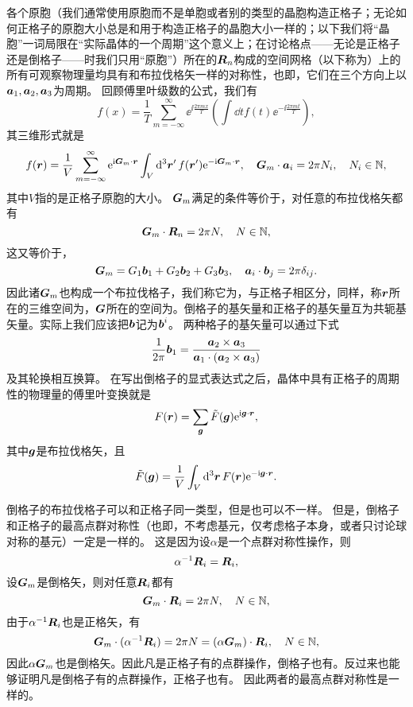各个原胞（我们通常使用原胞而不是单胞或者别的类型的晶胞构造正格子；无论如何正格子的原胞大小总是和用于构造正格子的晶胞大小一样的；以下我们将“晶胞”一词局限在“实际晶体的一个周期”这个意义上；在讨论格点——无论是正格子还是倒格子——时我们只用“原胞”）所在的$\vb*{R}_n$构成的空间网格（以下称为）上的所有可观察物理量均具有和布拉伐格矢一样的对称性，也即，它们在三个方向上以$\vb*{a}_1,\vb*{a}_2,\vb*{a}_3$为周期。
回顾傅里叶级数的公式，我们有
\[
    f(x) = \frac{1}{T} \sum_{m=-\infty}^\infty \ee^{\ii \frac{2\pi m x}{T}} \left(\int \dd{t} f(t) \ee^{-\ii \frac{2\pi m t}{T}}\right) ,
\]
其三维形式就是
\[
    f(\vb*{r}) = \frac{1}{V} \sum_{m=-\infty}^\infty \mathrm{e}^{\mathrm{i} \vb*{G}_m \cdot \vb*{r}} \int_V \dd[3]{\vb*{r}'} f(\vb*{r}') \mathrm{e}^{- \mathrm{i} \vb*{G}_m \cdot \vb*{r}}, \quad \vb*{G}_m \cdot \vb*{a}_i = 2\pi N_i, \quad N_i \in \mathbb{N},
\]
其中$V$指的是正格子原胞的大小。
$\vb*{G}_m$满足的条件等价于，对任意的布拉伐格矢都有
\begin{equation}
    \vb*{G}_m \cdot \vb*{R}_n = 2\pi N, \quad N \in \mathbb{N},
\end{equation}
这又等价于，
\begin{equation}
    \vb*{G}_m = G_1 \vb*{b}_1 + G_2 \vb*{b}_2 + G_3 \vb*{b}_3, \quad \vb*{a}_i \cdot \vb*{b}_j = 2 \pi \delta_{ij}.
\end{equation}
因此诸$\vb*{G}_m$也构成一个布拉伐格子，我们称它为，与正格子相区分，同样，称$\vb*{r}$所在的三维空间为，$\vb*{G}$所在的空间为。倒格子的基矢量和正格子的基矢量互为共轭基矢量。实际上我们应该把$\vb*{b}$记为$\vb*{b}^{i}$。
两种格子的基矢量可以通过下式
\begin{equation}
    \frac{1}{2\pi} \vb*{b}_1 = \frac{\vb*{a}_2 \times \vb*{a}_3}{\vb*{a}_1 \cdot (\vb*{a}_2 \times \vb*{a}_3)}
\end{equation}
及其轮换相互换算。
在写出倒格子的显式表达式之后，晶体中具有正格子的周期性的物理量的傅里叶变换就是
\begin{equation}
    F(\vb*{r}) = \sum_{\vb*{g}} \tilde{F}(\vb*{g}) \mathrm{e}^{\mathrm{i} \vb*{g} \cdot \vb*{r}},
\end{equation}
其中$\vb*{g}$是布拉伐格矢，且
\begin{equation}
    \tilde{F}(\vb*{g}) = \frac{1}{V} \int_V \dd[3]{\vb*{r}} F(\vb*{r}) \mathrm{e}^{-\mathrm{i} \vb*{g} \cdot \vb*{r}}.
\end{equation}

倒格子的布拉伐格子可以和正格子同一类型，但是也可以不一样。
但是，倒格子和正格子的最高点群对称性（也即，不考虑基元，仅考虑格子本身，或者只讨论球对称的基元）一定是一样的。
这是因为设$\alpha$是一个点群对称性操作，则
\[
    \alpha^{-1} \vb*{R}_i = \vb*{R}_i,
\]
设$\vb*{G}_m$是倒格矢，则对任意$\vb*{R}_i$都有
\[
    \vb*{G}_m \cdot \vb*{R}_i = 2 \pi N, \quad N \in \mathbb{N},
\]
由于$\alpha^{-1} \vb*{R}_i$也是正格矢，有
\[
    \vb*{G}_m \cdot (\alpha^{-1} \vb*{R}_i) = 2 \pi N = (\alpha \vb*{G}_m) \cdot \vb*{R}_i, \quad N \in \mathbb{N},
\]
因此$\alpha \vb*{G}_m$也是倒格矢。因此凡是正格子有的点群操作，倒格子也有。反过来也能够证明凡是倒格子有的点群操作，正格子也有。
因此两者的最高点群对称性是一样的。

